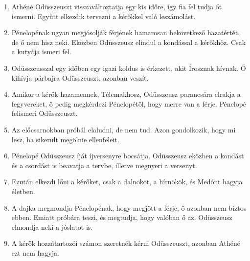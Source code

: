 \documentclass[]{article}
\begin{document}
\begin{enumerate}
				\item Athéné Odüsszeuszt visszaváltoztatja egy kis időre, így fia fel tudja őt ismerni. Együtt elkezdik tervezni a kérőkkel való leszámolást.
				
				\item Pénelopénak ugyan megjósolják férjének hamarosan bekövetkező hazatértét, de ő nem hisz neki. Eközben Odüsszeusz elindul a kondással a kérőkhöz. Csak a kutyája ismeri fel.
				
				\item Odüsszeusszal egy időben egy igazi koldus is érkezett, akit Írosznak hívnak. Ő kihívja párbajra Odüsszeuszt, azonban veszít. 
				
				\item Amikor a kérők hazamennek, Télemakhosz, Odüsszeusz parancsára elrakja a fegyvereket, ő pedig megkérdezi Pénelopétől, hogy merre van a férje. Pénelopé felismeri Odüsszeuszt.
				
				\item Az előcsarnokban próbál elaludni, de nem tud. Azon gondolkozik, hogy mi lesz, ha sikerült megölnie ellenfeleit.
				
				\item Pénelopé Odüsszeusz íját íjversenyre bocsátja. Odüsszeusz eközben a kondást és a csordást is beavatja a tervbe, illetve megnyeri a versenyt.
				
				\item Ezután elkezdi lőni a kérőket, csak a dalnokot, a hírnökök, és Medónt hagyja életben.
				
				\item A dajka megmondja Pénelopénak, hogy megjött a férje, ő azonban nem biztos ebben. Emiatt próbára teszi, és megtudja, hogy valóban ő az. Odüsszeusz elmondja neki a jóslatot is.
				
				\item  A kérők hozzátartozói számon szeretnék kérni Odüsszeuszt, azonban Athéné ezt nem hagyja.
			\end{enumerate}
			\cite{Odusszeia_tartalom}


\end{document}
